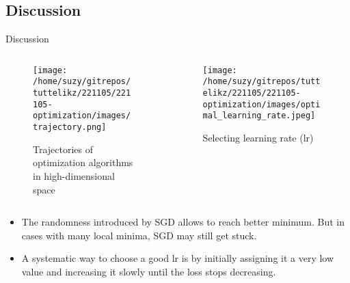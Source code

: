     \subsection{Discussion}
    \begin{frame}{Discussion}  
      \begin{columns}
        \begin{column}{0.5\textwidth}  %
          \begin{figure}[htb]
            \begin{center}
              \texttt{[image: /home/suzy/gitrepos/tuttelikz/221105/221105-optimization/images/trajectory.png]}
              \caption{Trajectories of optimization algorithms in high-dimensional space~\cite{ruder2016overview}}
            \end{center}
          \end{figure}
        \end{column}
        \begin{column}{0.5\textwidth}  %
          \begin{figure}[htb]
            \begin{center}
              \texttt{[image: /home/suzy/gitrepos/tuttelikz/221105/221105-optimization/images/optimal\_learning\_rate.jpeg]}
              \caption{Selecting learning rate (lr)~\cite{mohanty_2019}}
            \end{center}
          \end{figure}
        \end{column}
    \end{columns}
      \begin{itemize}
        \item The randomness introduced by SGD allows to reach better minimum. But in cases with many local minima, SGD may still get stuck.
        \item A systematic way to choose a good lr is by initially assigning it a very low value and increasing it slowly until the loss stops decreasing.
      \end{itemize}

    \end{frame}


